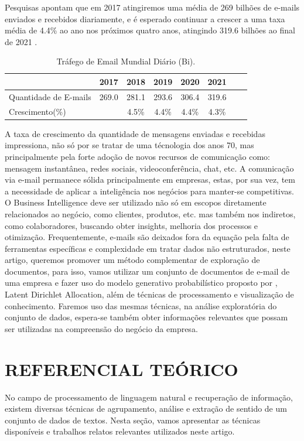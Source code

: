 \documentclass[12pt,a4paper]{article}
\begin{document}
Pesquisas apontam que em 2017 atingiremos uma média de 269 bilhões de e-mails enviados e recebidos diariamente, e é esperado continuar a crescer a uma taxa média de 4.4\% ao ano nos próximos quatro anos,
atingindo 319.6 bilhões ao final de 2021 \cite{radicati2017}.

\begin{table}[h]
  \centering
  \begin{tabular}{l*{6}{c}r}
  &					2017 &	2018 &	2019 &	2020 &	2021 & \\
  \hline
  Quantidade de E-mails &			269.0 &	281.1 &	293.6 &	306.4 &	319.6 & \\
  Crescimento(\%) &  	&		4.5\% &	4.4\% &	4.4\% &	4.3\% & \\
  \hline
  \end{tabular}
  \caption{Tráfego de Email Mundial Diário  (Bi). \cite{radicati2017}}
\end{table}

A taxa de crescimento da quantidade de mensagens enviadas e recebidas impressiona, não só por se tratar de uma técnologia dos anos 70,
mas principalmente pela forte adoção de novos recursos de comunicação como: mensagem instantânea, redes sociais, videoconferência, chat, etc. A comunicação via e-mail permanece sólida principalmente em empresas,
estas, por sua vez, tem a necessidade de aplicar a inteligência nos negócios para manter-se competitivas. O Business Intelligence deve ser utilizado não só em escopos diretamente relacionados ao negócio,
como clientes, produtos, etc. mas também nos indiretos, como colaboradores, buscando obter insights, melhoria dos processos e otimização.
Frequentemente, e-mails são deixados fora da equação pela falta de ferramentas específicas e complexidade em tratar dados não estruturados,
neste artigo, queremos promover um método complementar de exploração de documentos, para isso,
vamos utilizar um conjunto de documentos de e-mail de uma empresa e fazer uso do modelo generativo probabilístico proposto por , Latent Dirichlet Allocation,
além de técnicas de processamento e visualização de conhecimento. Faremos uso das mesmas técnicas, na análise exploratória do conjunto de dados,
espera-se também obter informações relevantes que possam ser utilizadas na compreensão do negócio da empresa.

\section{REFERENCIAL TEÓRICO}
No campo de processamento de linguagem natural e recuperação de informação, existem diversas técnicas de agrupamento, análise e extração de sentido de um conjunto de dados de textos.
 Nesta seção, vamos apresentar as técnicas disponíveis e trabalhos relatos relevantes utilizados neste artigo.
\end{document}
